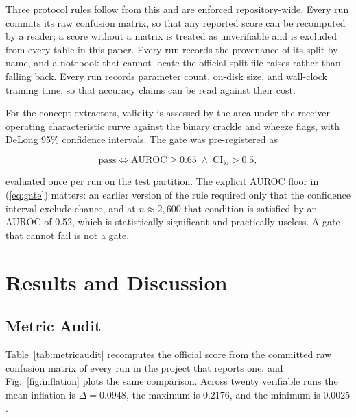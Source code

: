 \documentclass[journal,onecolumn]{IEEEtran}
\begin{document}
Three protocol rules follow from this and are enforced repository-wide. Every run
commits its raw confusion matrix, so that any reported score can be recomputed by a
reader; a score without a matrix is treated as unverifiable and is excluded from
every table in this paper. Every run records the provenance of its split by name, and
a notebook that cannot locate the official split file raises rather than falling back.
Every run records parameter count, on-disk size, and wall-clock training time, so
that accuracy claims can be read against their cost.

For the concept extractors, validity is assessed by the area under the receiver
operating characteristic curve against the binary crackle and wheeze flags, with
DeLong 95\% confidence intervals. The gate was pre-registered as

\begin{equation}
\label{eq:gate}
\text{pass} \iff \mathrm{AUROC} \geq 0.65 \;\wedge\; \mathrm{CI}_{\text{lo}} > 0.5 ,
\end{equation}

\noindent evaluated once per run on the test partition. The explicit AUROC floor in
(\ref{eq:gate}) matters: an earlier version of the rule required only that the
confidence interval exclude chance, and at $n \approx 2{,}600$ that condition is
satisfied by an AUROC of 0.52, which is statistically significant and practically
useless. A gate that cannot fail is not a gate.

\section{Results and Discussion}
\label{sec:results}

\subsection{Metric Audit}
\label{subsec:metric_audit}

Table~\ref{tab:metricaudit} recomputes the official score from the committed raw
confusion matrix of every run in the project that reports one, and
Fig.~\ref{fig:inflation} plots the same comparison. Across twenty verifiable runs the
mean inflation is $\Delta = 0.0948$, the maximum is $0.2176$, and the minimum is
$0.0025$.
\end{document}

